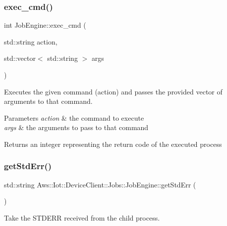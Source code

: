 \subsubsection{\texorpdfstring{exec\+\_\+cmd()}{exec\_cmd()}}
{\footnotesize\ttfamily int Job\+Engine\+::exec\+\_\+cmd (\begin{DoxyParamCaption}\item[{std\+::string}]{action,  }\item[{std\+::vector$<$ std\+::string $>$}]{args }\end{DoxyParamCaption})}



Executes the given command (action) and passes the provided vector of arguments to that command. 


\begin{DoxyParams}{Parameters}
{\em action} & the command to execute \\
\hline
{\em args} & the arguments to pass to that command \\
\hline
\end{DoxyParams}
\begin{DoxyReturn}{Returns}
an integer representing the return code of the executed process 
\end{DoxyReturn}
\mbox{\label{class_aws_1_1_iot_1_1_device_client_1_1_jobs_1_1_job_engine_a2f3764967a7d06f30fe7e3df583b5040}} 
\subsubsection{\texorpdfstring{get\+Std\+Err()}{getStdErr()}}
{\footnotesize\ttfamily std\+::string Aws\+::\+Iot\+::\+Device\+Client\+::\+Jobs\+::\+Job\+Engine\+::get\+Std\+Err (\begin{DoxyParamCaption}{ }\end{DoxyParamCaption})\hspace{0.3cm}{\ttfamily [inline]}}



Take the S\+T\+D\+E\+RR received from the child process. 


